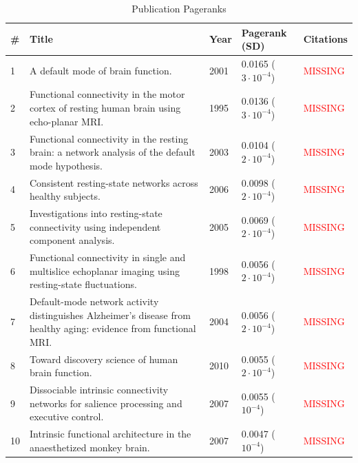 \documentclass[12pt,5p]{elsarticle}
\begin{document}
\begin{table}
	\caption{Publication Pageranks\label{table:pub_pageranks} }
	\begin{tabular}{|m{.15in}|m{4.3in}|m{.3in}|m{1.1in}|m{.65in}|} \hline
		\# & Title & Year & Pagerank (SD) & Citations \\ \hline \hline 
		1 & A default mode of brain
		function.\cite{Raichle2001}&2001&0.0165 ($3\cdot\!
		10^{-4}$) & \textcolor{red}{MISSING}\\ \hline 
		2 & Functional connectivity in the motor cortex of resting
		human brain using echo-planar MRI.\cite{Biswal1995}&1995&0.0136
		($3\cdot\! 10^{-4}$) & \textcolor{red}{MISSING}\\ \hline
		3 & Functional connectivity in the resting brain: a network
		analysis of the default mode
		hypothesis.\cite{Greicius2003}&2003&0.0104 ($2\cdot\!
		10^{-4}$)& \textcolor{red}{MISSING}\\  \hline
		4 & Consistent resting-state networks across
		healthy subjects.\cite{Damoiseaux2006}&2006&0.0098 ($2\cdot\!
		10^{-4}$)& \textcolor{red}{MISSING}\\  \hline
		5 & Investigations into resting-state
		connectivity using independent component
		analysis.\cite{Beckmann2005}&2005&0.0069 ($2\cdot\!
		10^{-4}$)& \textcolor{red}{MISSING}\\  \hline
		6 & Functional connectivity in single and
		multislice echoplanar imaging using resting-state
		fluctuations.\cite{Lowe1998}&1998&0.0056 ($2\cdot\! 10^{-4}$)
		& \textcolor{red}{MISSING}\\  \hline
		7&Default-mode network activity distinguishes Alzheimer's
		disease from healthy aging: evidence from functional
		MRI.\cite{Greicius2004}&2004&0.0056 ($2\cdot\! 10^{-4}$)
		& \textcolor{red}{MISSING}\\ \hline
		8&Toward discovery science of human brain
		function.\cite{Biswal2010}&2010&0.0055 ($2\cdot\! 10^{-4}$)
		& \textcolor{red}{MISSING}\\  \hline
		9&Dissociable intrinsic connectivity networks for salience
		processing and executive control.\cite{Seeley2007}&2007&0.0055
		($10^{-4}$) & \textcolor{red}{MISSING}\\  \hline
		10&Intrinsic functional architecture in the
		anaesthetized monkey brain.\cite{Vincent2007}&2007&0.0047
		($10^{-4}$) & \textcolor{red}{MISSING}\\  \hline
\end{tabular}
\end{table}
\end{document}

